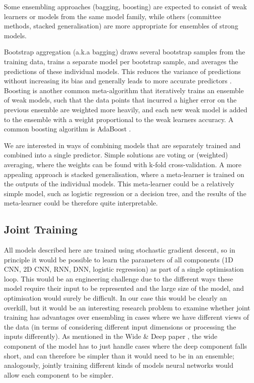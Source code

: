 Some ensembling approaches (bagging, boosting)  are expected to consist of weak learners or models from the same model family, while others (committee methods, stacked generalisation) are more appropriate for ensembles of strong models.

Bootstrap aggregation (a.k.a bagging)   draws several bootstrap samples  from the training data,  trains a separate model per bootstrap sample,  and averages the predictions of these individual models.  This reduces the variance of predictions without increasing its bias and generally leads to  more accurate predictors \cite{bagging}.
Boosting is another common meta-algorithm that iteratively trains an ensemble of weak models, such that the data points that incurred a higher error on the previous ensemble are weighted more heavily, and each new weak model is added to the ensemble with a weight proportional to the weak learners accuracy.
A common boosting algorithm is AdaBoost \cite{adaboost}.

We are interested in ways of combining models that are separately trained and combined into a single predictor.
Simple solutions are voting or (weighted) averaging, where the weights can be found with k-fold cross-validation.
A more appealing approach is stacked generalisation, where a meta-learner is trained on the outputs of the individual models.
This meta-learner could be a relatively simple model, such as logistic regression or a decision tree, and the results of the meta-learner could be therefore quite interpretable.

\subsection{Joint Training}
\label{joint}

All models described here are trained using stochastic gradient descent, so in principle it would be possible to learn the parameters of all components (1D CNN, 2D CNN, RNN, DNN, logistic regression) as part of a single optimisation loop.
This would be an engineering challenge due to the different ways these model require their input to be represented and the large size of the model, and optimisation would surely be difficult.
In our case this would be clearly an overkill, but it would be an interesting research problem to examine whether joint training has advantages over ensembling in cases where we have different views of the data (in terms of considering different input dimensions or processing the inputs differently).
As mentioned in the Wide \& Deep paper \cite{wide_deep}, the wide component of the model has to just handle cases where the deep component falls short, and can therefore be simpler than it would need to be in an ensemble; analogously, jointly training different kinds of models neural networks would allow each component to be simpler.

